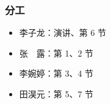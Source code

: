 \begin{frame}[plain]
    \frametitle{分工}
    \begin{itemize}
        \item 李子龙：演讲、第 6 节
        \item 张　露：第 1、2 节
        \item 李婉婷：第 3、4 节
        \item 田淏元：第 5、7 节
    \end{itemize}
\end{frame}

\makebottom[min]
